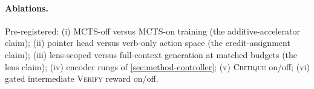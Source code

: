 \paragraph{Ablations.} Pre-registered: (i) MCTS-off versus MCTS-on training
(the additive-accelerator claim); (ii) pointer head versus verb-only action
space (the credit-assignment claim); (iii) lens-scoped versus full-context
generation at matched budgets (the lens claim); (iv) encoder rungs of
\cref{sec:method-controller}; (v) \textsc{Critique} on/off; (vi) gated
intermediate \textsc{Verify} reward on/off.
